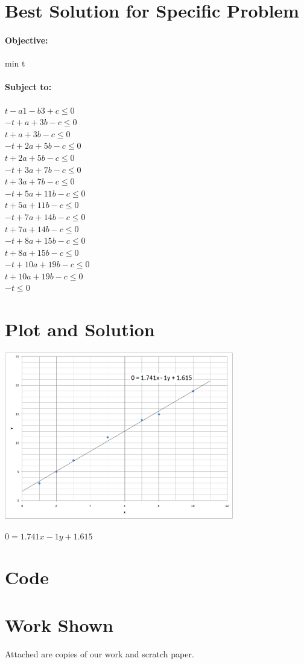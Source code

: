 \documentclass{article}
\begin{document}
\section*{Best Solution for Specific Problem}
\paragraph*{Objective:}
min t

\paragraph*{Subject to:\\}
$t - a1 - b3 + c \leq 0$\\
$-t + a + 3b - c \leq 0$\\
$t + a + 3b - c \leq 0$\\
$-t + 2a + 5b - c \leq 0$\\
$t + 2a + 5b - c \leq 0$\\
$-t + 3a + 7b - c \leq 0$\\
$t + 3a + 7b - c \leq 0$\\
$-t + 5a + 11b - c \leq 0$\\
$t + 5a + 11b - c \leq 0$\\
$-t + 7a + 14b - c \leq 0$\\
$t + 7a + 14b - c \leq 0$\\
$-t + 8a + 15b - c \leq 0$\\
$t + 8a + 15b - c \leq 0$\\
$-t + 10a + 19b - c \leq 0$\\
$t + 10a + 19b - c \leq 0$\\
$-t \leq 0$\\


\section*{Plot and Solution}
\centerline{\includegraphics[width=0.75\textwidth]{plot.png}}
$0 = 1.741x - 1y + 1.615$

\section*{Code}


\section*{Work Shown}
Attached are copies of our work and scratch paper.
\end{document}
